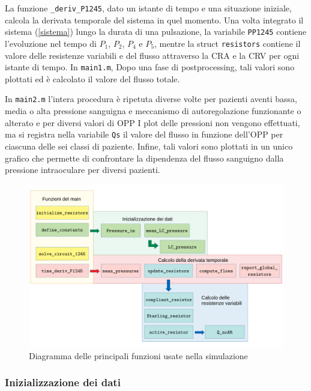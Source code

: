 \documentclass{article}
\begin{document}
La funzione \texttt{\@time\_deriv\_P1245}, dato un istante di tempo e una situazione iniziale, calcola la derivata temporale del sistema in quel momento.
Una volta integrato il sistema (\ref{sistema}) lungo la durata di una pulsazione, la variabile \texttt{PP1245} contiene l'evoluzione nel tempo di $P_1$, $P_2$, $P_4$ e $P_5$, mentre la struct \texttt{resistors} contiene il valore delle resistenze variabili e del flusso attraverso la CRA e la CRV per ogni istante di tempo.
In \texttt{main1.m}, Dopo una fase di postprocessing, tali valori sono plottati ed è calcolato il valore del flusso totale.

In \texttt{main2.m} l'intera procedura è ripetuta diverse volte per pazienti aventi bassa, media o alta pressione sanguigna e meccanismo di autoregolazione funzionante o alterato e per diversi valori di OPP
I plot delle pressioni non vengono effettuati, ma si registra nella variabile \texttt{Qs} il valore del flusso in funzione dell'OPP per ciascuna delle sei classi di paziente.
Infine, tali valori sono plottati in un unico grafico che permette di confrontare la dipendenza del flusso sanguigno dalla pressione intraoculare per diversi pazienti.

\begin{figure}[h]
\begin{center}
\includegraphics[width=1.0\textwidth]{Pictures/class_diagram.pdf}
\caption{Diagramma delle principali funzioni usate nella simulazione}
\label{diagramma_classi}
\end{center}
\end{figure}
\subsubsection*{Inizializzazione dei dati}
\end{document}
